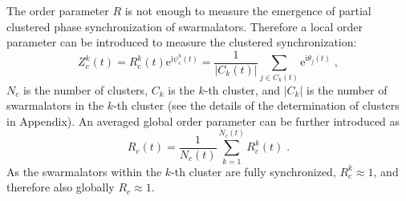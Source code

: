 \documentclass{article}
\begin{document}
The order parameter $R$ is not enough to measure the emergence of partial clustered phase synchronization of swarmalators. Therefore a local order parameter can be introduced to measure the clustered synchronization:
\begin{equation}
    Z_c^k (t) = R_c^k \left( t \right) \mathrm{e}^{\textrm{i}\psi_c^k (t)} =  \frac{1}{\left| C_k\left( t \right) \right|}\sum_{j\in C_k\left( t \right)}{\mathrm{e}^{\mathrm{i}\theta _j\left( t \right)}} \;,
\end{equation}
$N_c$ is the number of clusters, $C_k$ is the $k$-th cluster, and $\left| C_k \right|$ is the number of swarmalators in the $k$-th cluster (see the details of the determination of clusters in Appendix). An averaged global order parameter can be further introduced as
\begin{equation}
    R_c\left( t \right) =\frac{1}{N_c\left( t \right)}\sum_{k=1}^{N_c\left( t \right)}{R^k_c (t)}\;.
\end{equation}
As the swarmalators within the $k$-th cluster are fully synchronized, $R_c^k\approx 1$, and therefore also globally $R_c\approx 1$.
\end{document}
